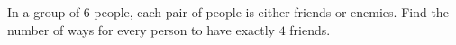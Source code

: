 In a group of $6$ people, each pair of people is either friends or enemies. Find the number of ways for every person to have exactly $4$ friends.
